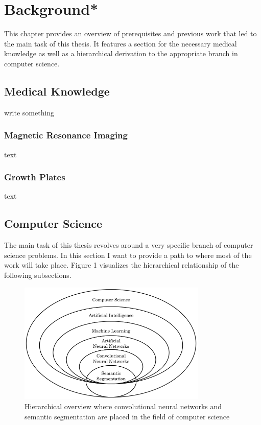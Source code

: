 \section{Background*}

This chapter provides an overview of prerequisites and previous work that led to the main task of this thesis. It features a section for the necessary medical knowledge as well as a hierarchical derivation to the appropriate branch in computer science.

\subsection{Medical Knowledge}

write something

\subsubsection{Magnetic Resonance Imaging}

text

\subsubsection{Growth Plates}

text

\subsection{Computer Science}

The main task of this thesis revolves around a very specific branch of computer science problems. In this section I want to provide a path to where most of the work will take place. Figure 1 visualizes the hierarchical relationship of the following subsections.

\begin{figure}[H]
\centering
\par
\includegraphics[width=0.8\textwidth]{imgs/cs_hier.png}
\caption{Hierarchical overview where convolutional neural networks and semantic segmentation are placed in the field of computer science}
\par
\end{figure}

